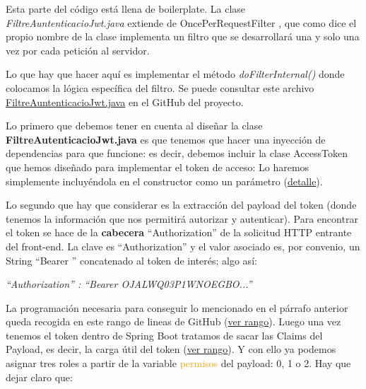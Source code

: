 \documentclass[a4paper,12pt]{report}
\begin{document}
		Esta parte del código está llena de boilerplate. La clase \textit{FiltreAuntenticacioJwt.java} extiende de OncePerRequestFilter \cite{oncePerRequestFilter}, que como dice el propio nombre de la clase implementa un filtro que se desarrollará una y solo una vez por cada petición al servidor.
		
		Lo que hay que hacer aquí es implementar el método \textit{doFilterInternal()} donde colocamos la lógica específica del filtro. Se puede consultar este archivo \href{https://github.com/blackcub3s/mercApp/blob/main/APP%20WEB/__springboot__produccio__/app/src/main/java/miApp/app/seguretat/FiltreAutenticacioJwt.java}{FiltreAuntenticacioJwt.java} en el GitHub del proyecto.
		
		Lo primero que debemos tener en cuenta al diseñar la clase \textbf{FiltreAutenticacioJwt.java} es que tenemos que hacer una inyección de dependencias para que funcione: es decir, debemos incluir la clase AccessToken que hemos diseñado para implementar el token de acceso: Lo haremos simplemente incluyéndola en el constructor como un parámetro (\href{https://github.com/blackcub3s/mercApp/blob/7632267dad299fa738fa9c45b0beae6c2f278cda/APP%20WEB/__springboot__produccio__/app/src/main/java/miApp/app/seguretat/FiltreAutenticacioJwt.java#L25-L28}{detalle}).
		
		Lo segundo que hay que considerar es la extracción del payload del token (donde tenemos la información que nos permitirá autorizar y autenticar). Para encontrar el token se hace de la \textbf{cabecera} ``Authorization'' de la solicitud HTTP entrante del front-end. La clave es ``Authorization'' y el valor asociado es, por convenio, un String ``Bearer '' concatenado al token de interés; algo así:
		

		
		\FloatBarrier
		\begin{table}[h]
				\centering
 				\textit{``Authorization'' : ``Bearer OJALWQ03P1WNOEGBO...''}
		\end{table}
		\FloatBarrier
		

		 
		  La programación necesaria para conseguir lo mencionado en el párrafo anterior queda recogida en este rango de lineas de GitHub (\href{https://github.com/blackcub3s/mercApp/blob/89efcf854d8bbab2addde3f7e817eb97f7737b95/APP%20WEB/__springboot__produccio__/app/src/main/java/miApp/app/seguretat/FiltreAutenticacioJwt.java#L33-L43}{ver rango}). Luego una vez tenemos el token dentro de Spring Boot tratamos de sacar las Claims del Payload, es decir, la carga útil del token (\href{https://github.com/blackcub3s/mercApp/blob/89efcf854d8bbab2addde3f7e817eb97f7737b95/APP%20WEB/__springboot__produccio__/app/src/main/java/miApp/app/seguretat/FiltreAutenticacioJwt.java#L50-L54}{ver rango}). Y con ello ya podemos asignar tres roles a partir de la variable \textcolor{orange}{permisos} del payload: 0, 1 o 2. Hay que dejar claro que: 
		  
\end{document}
